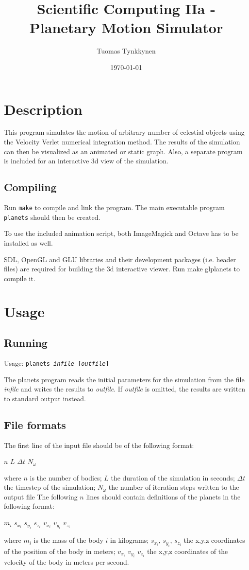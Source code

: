 \documentclass[a4paper]{article}
\title{Scientific Computing IIa - Planetary Motion Simulator}
\author{Tuomas Tynkkynen}
\date{\today}
\begin{document}
 \maketitle
 \section{Description}
 This program simulates the motion of arbitrary number of celestial objects using the Velocity Verlet\cite{VV} numerical integration method.
 The results of the simulation can then be visualized as an animated or static graph.
 Also, a separate program is included for an interactive 3d view of the simulation.
  \subsection{Compiling}
  Run \texttt{make} to compile and link the program.
  The main executable program \texttt{planets} should then be created.

  To use the included animation script, both ImageMagick and Octave has to be installed as well.

  SDL, OpenGL and GLU libraries and their development packages (i.e. header files) are required for building the 3d interactive viewer.
  Run make glplanets to compile it.
 \section{Usage}
  \subsection{Running}
  \begin{center}
  Usage: \texttt{planets \emph{infile} [\emph{outfile}]}\\
  \end{center}
  The planets program reads the initial parameters for the simulation from the file \emph{infile} and writes the results to \emph{outfile}.
  If \emph{outfile} is omitted, the results are written to standard output instead.
  \subsection{File formats}
   The first line of the input file should be of the following format:
   \begin{center}$n$ $L$ $\Delta t$ $N_\omega$\end{center}
   where $n$ is the number of bodies; $L$ the duration of the simulation in seconds; $\Delta t$ the timestep of the simulation;
   $N_\omega$ the number of iteration steps written to the output file
   The following $n$ lines should contain definitions of the planets in the following format:
   \begin{center}$m_i$ $s_{x_i}$ $s_{y_i}$ $s_{z_i}$ $v_{x_i}$ $v_{y_i}$ $v_{z_i}$\end{center}
   where $m_i$ is the mass of the body $i$ in kilograms; $s_{x_i}$, $s_{y_i}$, $s_{z_i}$ the x,y,z coordinates of the position of the body in meters; 
   $v_{x_i}$ $v_{y_i}$ $v_{z_i}$ the x,y,z coordinates of the velocity of the body in meters per second.
\end{document}
